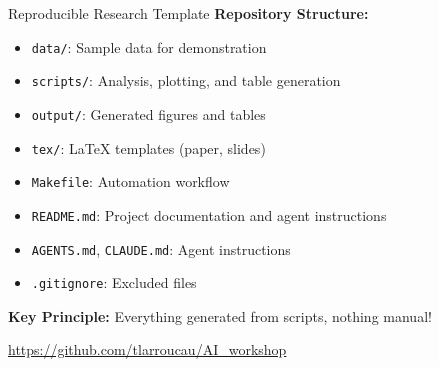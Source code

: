 \documentclass[11pt,aspectratio=169]{beamer}
\begin{document}
\begin{frame}{Reproducible Research Template}
\hypertarget{main-project-structure}{}
\textbf{Repository Structure:}
\begin{itemize}
    \item \texttt{data/}: Sample data for demonstration
    \item \texttt{scripts/}: Analysis, plotting, and table generation
    \item \texttt{output/}: Generated figures and tables
    \item \texttt{tex/}: LaTeX templates (paper, slides)
    \item \texttt{Makefile}: Automation workflow
    \item \texttt{README.md}: Project documentation and agent instructions
    \item \texttt{AGENTS.md}, \texttt{CLAUDE.md}: Agent instructions
    \item \texttt{.gitignore}: Excluded files
\end{itemize}

\vspace{0.3cm}

\textbf{Key Principle:} Everything generated from scripts, nothing manual!

\vspace{0.15cm}
{\small \url{https://github.com/tlarroucau/AI_workshop}}\\
\hyperlink{appendix-makefile}{}
\end{frame}
\end{document}
